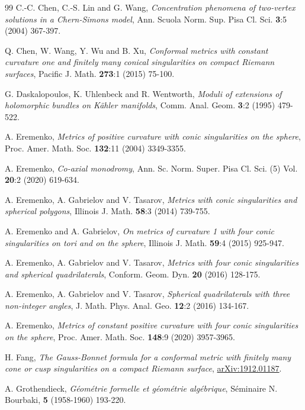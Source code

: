 \documentclass[12pt]{article}
\begin{document}
\begin{thebibliography}{99}
   C.-C. Chen, C.-S. Lin and G. Wang, \emph{Concentration phenomena of two-vertex solutions in a Chern-Simons model}, Ann. Scuola Norm. Sup. Pisa Cl. Sci. {\bf 3}:5 (2004) 367-397.

   Q. Chen, W. Wang, Y. Wu and B. Xu, \emph{Conformal metrics with constant curvature one and finitely many conical singularities on compact Riemann surfaces}, Pacific J. Math. {\bf 273}:1 (2015) 75-100.

   G. Daskalopoulos, K. Uhlenbeck and R. Wentworth, \emph{Moduli of extensions of holomorphic bundles on K\"ahler manifolds}, Comm. Anal. Geom. {\bf 3}:2 (1995) 479-522.

   A. Eremenko, \emph{Metrics of positive curvature with conic singularities on the sphere}, Proc. Amer. Math. Soc. {\bf 132}:11 (2004) 3349-3355.

   A. Eremenko, \emph{Co-axial monodromy}, Ann. Sc. Norm. Super. Pisa Cl. Sci. (5) Vol. {\bf 20}:2 (2020) 619-634.

   A. Eremenko,  A. Gabrielov and V. Tasarov, \emph{Metrics with conic singularities and spherical
polygons},  Illinois J. Math. {\bf 58}:3 (2014) 739-755.

   A. Eremenko and A. Gabrielov, \emph{On metrics of curvature 1 with four conic singularities on tori and on the sphere}, Illinois J. Math. {\bf 59}:4 (2015) 925-947.

   A. Eremenko,  A. Gabrielov and V. Tasarov, \emph{Metrics with four conic singularities and
spherical quadrilaterals}, Conform. Geom. Dyn. {\bf 20} (2016) 128-175.

   A. Eremenko,  A. Gabrielov and V. Tasarov, \emph{Spherical quadrilaterals with three non-integer
angles}, J. Math. Phys. Anal. Geo. {\bf 12}:2 (2016) 134-167.

 A. Eremenko, \emph{Metrics of constant positive curvature with four conic singularities on the sphere}, Proc. Amer. Math. Soc. {\bf 148}:9 (2020) 3957-3965.

 H. Fang, \emph{The Gauss-Bonnet formula for a conformal metric with finitely many cone or cusp singularities on a compact Riemann surface}, \href{https://arxiv.org/abs/1912.01187}{arXiv:1912.01187}.


   A. Grothendieck, \emph{G\'eom\'etrie formelle et g\'eom\'etrie alg\'ebrique}, S\'eminaire N. Bourbaki, {\bf 5} (1958-1960) 193-220.


\end{thebibliography}
\end{document}
